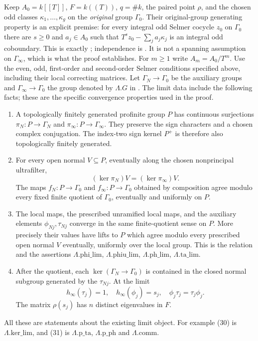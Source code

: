 Keep $A_0=k[[T]]$, $F=k((T))$, $q=\#k$, the paired point $\rho$,
and the chosen odd classes $\kappa_1,\ldots,\kappa_g$ on the
\emph{original} group $\Gamma_0$.
Their original-group generating property is an explicit premise:
for every integral odd Selmer cocycle $z_0$ on $\Gamma_0$ there
are $s\geq0$ and $a_j\in A_0$ such that
$T^sz_0-\sum_j a_j\kappa_j$ is an integral odd coboundary.
This is exactly ; independence is
.  It is not a spanning assumption on
$\Gamma_\infty$, which is what the proof establishes.
For $m\geq1$ write $A_m=A_0/T^m$.
Use the even, odd, first-order and second-order Selmer conditions
specified above, including their local correcting matrices.
Let $\Gamma_N\to\Gamma_0$ be the auxiliary groups and
$\Gamma_\infty\to\Gamma_0$ the group denoted by
$\Lambda.G$ in .
The limit data include the following facts; these are the
specific convergence properties used in the proof.
\begin{enumerate}
\item A topologically finitely generated profinite group $P$
has continuous surjections $\pi_N:P\to\Gamma_N$ and
$\pi_\infty:P\to\Gamma_\infty$.
They preserve the sign characters and a chosen complex
conjugation.  The index-two sign kernel $P^+$ is therefore
also topologically finitely generated.
\item For every open normal $V\subseteq P$, eventually along
the chosen nonprincipal ultrafilter,
\[
       (\ker\pi_N)V=(\ker\pi_\infty)V.
                                                               \tag{30}
\]
The maps $f_N:P\to\Gamma_0$ and $f_\infty:P\to\Gamma_0$
obtained by composition agree modulo every fixed finite
quotient of $\Gamma_0$, eventually and uniformly on $P$.
\item The local maps, the prescribed unramified local maps,
and the auxiliary elements $\phi_{Nj},\tau_{Nj}$ converge
in the same finite-quotient sense on $P$.
More precisely their values have lifts to $P$ which agree
modulo every prescribed open normal $V$ eventually,
uniformly over the local group.  This is the relation
 and the assertions
$\Lambda.\mathrm{phi\_lim}$,
$\Lambda.\mathrm{phiu\_lim}$,
$\Lambda.\mathrm{ph\_lim}$,
$\Lambda.\mathrm{ta\_lim}$.
\item After the  quotient, each
$\ker(\Gamma_N\to\Gamma_0)$ is contained in the closed normal
subgroup generated by the $\tau_{Nj}$.
At the limit
\[
 h_\infty(\tau_j)=1,\quad h_\infty(\phi_j)=s_j,\quad
                         \phi_j\tau_j=\tau_j\phi_j.             \tag{31}
\]
The matrix $\rho(s_j)$ has $n$ distinct eigenvalues in $F$.
\end{enumerate}
All these are statements about the existing limit object.
For example (30) is $\Lambda.\mathrm{ker\_lim}$, and (31)
is $\Lambda.\mathrm{p\_ta}$,
$\Lambda.\mathrm{p\_ph}$ and $\Lambda.\mathrm{comm}$.

